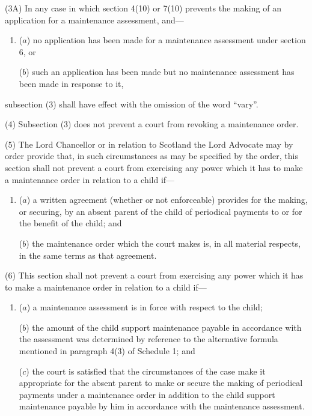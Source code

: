 \documentclass[12pt,a4paper]{article}
\begin{document}
(3A) In any case in which section 4(10) or 7(10) prevents the making of an application for a maintenance assessment, and—
\begin{enumerate}\item[]
($a$) no application has been made for a maintenance assessment under section 6, or

($b$) such an application has been made but no maintenance assessment has been made in response to it,
\end{enumerate}
subsection (3) shall have effect with the omission of the word “vary”.

(4) Subsection (3)  does not prevent a court from revoking a maintenance order.

(5) The Lord Chancellor or in relation to Scotland the Lord Advocate may by order provide that, in such circumstances as may be specified by the order, this section shall not prevent a court from exercising any power which it has to make a maintenance order in relation to a child if—
\begin{enumerate}\item[]
($a$) a written agreement (whether or not enforceable) provides for the making, or securing, by an absent parent of the child of periodical payments to or for the benefit of the child; and

($b$) the maintenance order which the court makes is, in all material respects, in the same terms as that agreement.
\end{enumerate}

(6) This section shall not prevent a court from exercising any power which it has to make a maintenance order in relation to a child if—
\begin{enumerate}\item[]
($a$) a maintenance assessment is in force with respect to the child;

($b$) the amount of the child support maintenance payable in accordance with the assessment was determined by reference to the alternative formula mentioned in paragraph 4(3)  of Schedule 1; and

($c$) the court is satisfied that the circumstances of the case make it appropriate for the absent parent to make or secure the making of periodical payments under a maintenance order in addition to the child support maintenance payable by him in accordance with the maintenance assessment.
\end{enumerate}
\end{document}
